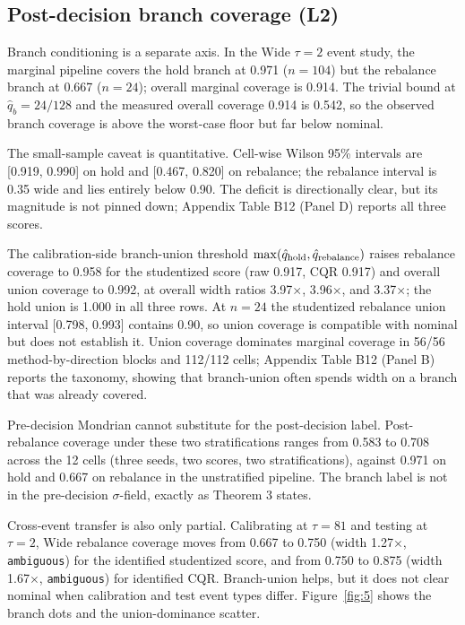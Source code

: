 \subsection{Post-decision branch coverage (L2)}

Branch conditioning is a separate axis. In the Wide $\tau=2$ event study, the marginal pipeline covers the hold branch at 0.971 ($n=104$) but the rebalance branch at 0.667 ($n=24$); overall marginal coverage is 0.914. The trivial bound at $\hat q_b=24/128$ and the measured overall coverage 0.914 is 0.542, so the observed branch coverage is above the worst-case floor but far below nominal.

The small-sample caveat is quantitative. Cell-wise Wilson 95\% intervals are [0.919, 0.990] on hold and [0.467, 0.820] on rebalance; the rebalance interval is 0.35 wide and lies entirely below 0.90. The deficit is directionally clear, but its magnitude is not pinned down; Appendix Table B12 (Panel D) reports all three scores.

The calibration-side branch-union threshold $\max(\hat q_{\rm hold},\hat q_{\rm rebalance})$ raises rebalance coverage to 0.958 for the studentized score (raw 0.917, CQR 0.917) and overall union coverage to 0.992, at overall width ratios 3.97$\times$, 3.96$\times$, and 3.37$\times$; the hold union is 1.000 in all three rows. At $n=24$ the studentized rebalance union interval [0.798, 0.993] contains 0.90, so union coverage is compatible with nominal but does not establish it. Union coverage dominates marginal coverage in 56/56 method-by-direction blocks and 112/112 cells; Appendix Table B12 (Panel B) reports the taxonomy, showing that branch-union often spends width on a branch that was already covered.

Pre-decision Mondrian cannot substitute for the post-decision label. Post-rebalance coverage under these two stratifications ranges from 0.583 to 0.708 across the 12 cells (three seeds, two scores, two stratifications), against 0.971 on hold and 0.667 on rebalance in the unstratified pipeline. The branch label is not in the pre-decision $\sigma$-field, exactly as Theorem 3 states.

Cross-event transfer is also only partial. Calibrating at $\tau=81$ and testing at $\tau=2$, Wide rebalance coverage moves from 0.667 to 0.750 (width 1.27$\times$, \texttt{ambiguous}) for the identified studentized score, and from 0.750 to 0.875 (width 1.67$\times$, \texttt{ambiguous}) for identified CQR. Branch-union helps, but it does not clear nominal when calibration and test event types differ. Figure~\ref{fig:5} shows the branch dots and the union-dominance scatter.

